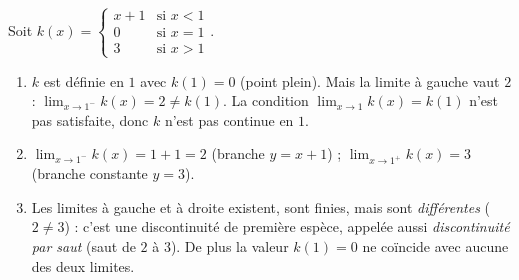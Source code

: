 \documentclass[11pt]{article}
\newcommand{\cle}[1]{{\popxbold\color{popdark}#1}}
\begin{document}
\begin{exoresolu}
Soit $k(x)=\begin{cases} x+1 & \text{si } x<1 \\ 0 & \text{si } x=1 \\ 3 & \text{si } x>1 \end{cases}$.
\begin{enumerate}
\item $k$ est définie en $1$ avec $k(1)=0$ (point plein). Mais la limite à gauche vaut $2$ : $\lim_{x\to 1^-}k(x)=2 \neq k(1)$. La condition $\lim_{x\to 1}k(x)=k(1)$ n'est pas satisfaite, donc $k$ n'est pas continue en $1$.
\item $\lim_{x\to 1^-}k(x)=1+1=2$ (branche $y=x+1$) ; $\lim_{x\to 1^+}k(x)=3$ (branche constante $y=3$).
\item Les limites à gauche et à droite existent, sont finies, mais sont \emph{différentes} ($2\neq 3$) : c'est une \cle{discontinuité de première espèce}, appelée aussi \emph{discontinuité par saut} (saut de $2$ à $3$). De plus la valeur $k(1)=0$ ne coïncide avec aucune des deux limites.
\end{enumerate}
\end{exoresolu}
\end{document}
